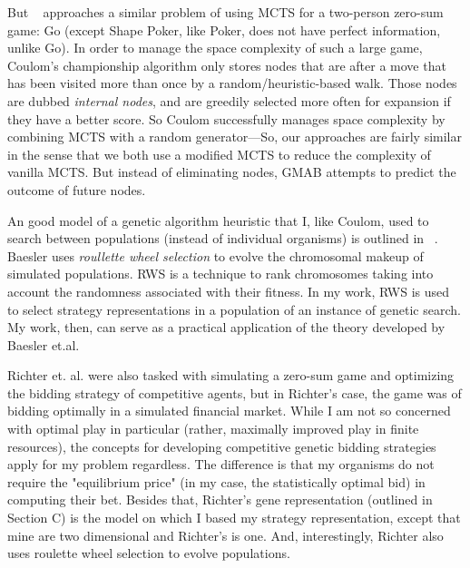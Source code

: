\documentclass[11pt]{article}
\begin{document}
But ~\cite{Coul-06} approaches a similar problem of using MCTS for a two-person zero-sum game: Go (except Shape Poker, like Poker, does not have perfect information, unlike Go). In order to manage the space complexity of such a large game, Coulom's championship algorithm only stores nodes that are after a move that has been visited more than once by a random/heuristic-based walk. Those nodes are dubbed \textit{internal nodes}, and are greedily selected more often for expansion if they have a better score. So Coulom successfully manages space complexity by combining MCTS with a random generator---So, our approaches are fairly similar in the sense that we both use a modified MCTS to reduce the complexity of vanilla MCTS. But instead of eliminating nodes, GMAB attempts to predict the outcome of future nodes.

An good model of a genetic algorithm heuristic that I, like Coulom, used to search between populations (instead of individual organisms) is outlined in ~\cite{Baes-Sepu-2000}. Baesler uses \textit{roullette wheel selection} to evolve the chromosomal makeup of simulated populations. RWS is a technique to rank chromosomes taking into account the randomness associated with their fitness. In my work, RWS is used to select strategy representations in a population of an instance of genetic search. My work, then, can serve as a practical application of the theory developed by Baesler et.al.

Richter et. al. \cite{Rich-Sheb-98} were also tasked with simulating a zero-sum game and optimizing the bidding strategy of competitive agents, but in Richter's case, the game was of bidding optimally in a simulated financial market. While I am not so concerned with optimal play in particular (rather, maximally improved play in finite resources), the concepts for developing competitive genetic bidding strategies apply for my problem regardless. The difference is that my organisms do not require the "equilibrium price" (in my case, the statistically optimal bid) in computing their bet. Besides that, Richter's gene representation (outlined in Section C) is the model on which I based my strategy representation, except that mine are two dimensional and Richter's is one. And, interestingly, Richter also uses roulette wheel selection to evolve populations.
\end{document}
